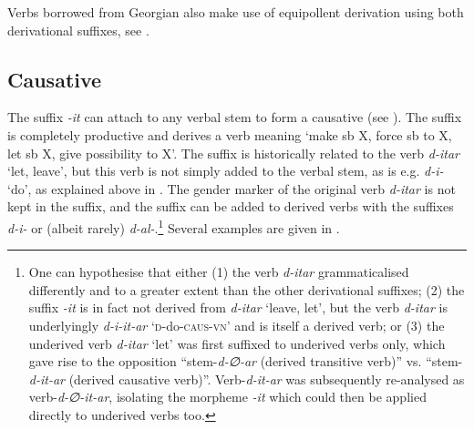 






Verbs borrowed from Georgian also make use of equipollent derivation using both derivational suffixes, see .

\largerpage[-1]\pagebreak


\subsection{Causative} \label{it-caus}

The suffix \textit{-it} can attach to any verbal stem to form a causative (see \cite{gagua87}). The suffix is completely productive and derives a verb meaning `make sb X, force sb to X, let sb X, give possibility to X'. The suffix is historically related to the verb \textit{d-itar} `let, leave', but this verb is not simply added to the verbal stem, as is e.g. \textit{d-i-} `do', as explained above in . The gender marker of the original verb \textit{d-itar} is not kept in the suffix, and the suffix can be added to derived verbs with the suffixes \textit{d-i-} or (albeit rarely) \textit{d-al-}.\footnote{One can hypothesise that either (1) the verb \textit{d-itar} grammaticalised differently and to a greater extent than the other derivational suffixes;  (2) the suffix \textit{-it} is in fact not derived from \textit{d-itar} `leave, let', but the verb \textit{d-itar} is underlyingly \textit{d-i-it-ar} `\textsc{d}-do-\textsc{caus-vn}' and is itself a derived verb; or (3) the underived verb \textit{d-itar} `let' was first suffixed to underived verbs only, which gave rise to the opposition ``stem-\textit{d-∅-ar} (derived transitive verb)'' vs. ``stem-\textit{d-it-ar} (derived causative verb)''. Verb-\textit{d-it-ar} was subsequently re-analysed as verb-\textit{d-∅-it-ar}, isolating the morpheme \textit{-it} which could then be applied directly to underived verbs too.}
Several examples are given in .

